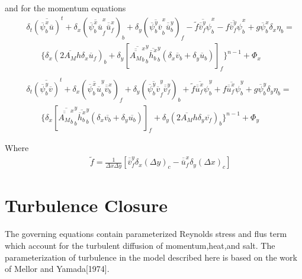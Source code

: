 \documentclass[oribibl]{llncs}
\begin{document}
and for the momentum equations
\begin{eqnarray}
&&\delta_t \overline{(\overline{\psi}^x_b \overline{u})}^t + \delta_x (\overline{\overline{\psi}^x_b \overline{u}}^x_f \overline{\overline{u}}^x_f)_b +  \delta_y (\overline{\overline{\psi}^y_b \overline{v}}^x_b \overline{\overline{u}}^y_b)_f - \overline {\tilde{f}\overline {\overline {v}}^y_f \psi}^x_b - \overline{f \overline{\overline{v}}^y_f \psi}^x_b + g\overline{\psi}^x_b \delta_x \eta_b = \nonumber \\
&&\ \ \ \ \ \ \ \  \{\delta_x (2 \overline {A_M}h\delta_x \overline{u}_f)_b+\delta_y [ \overline{ \overline {\overline{A_M}}^x_b }^y_b \overline {\overline{h}^x_b }^y_b (\delta_x \overline{v}_b + \delta_y \overline{u}_b)]_f\}^{n-1} + \Phi_x  \\
\nonumber \\
&&\delta_t \overline{(\overline{\psi}^y_b \overline{v})}^t + \delta_x (\overline{\overline{\psi}^x_b \overline{u}}^y_b \overline{\overline{v}}^x_b)_f +  \delta_y (\overline{\overline{\psi}^y_b \overline{v}}^y_f \overline{\overline{v}}^y_f)_b + \overline{ \tilde {f}\overline{\overline{u}}^x_f \psi}^y_b + \overline{f \overline{\overline{u}}^x_f \psi}^y_b + g\overline{\psi}^y_b \delta_y \eta_b = \nonumber \\
&&\ \ \ \ \ \ \ \  \{\delta_x [ \overline{ \overline {\overline {A_M}}^x_b }^y_b \overline {\overline{h}^x_b }^y_b (\delta_x \overline{v_b} + \delta_y \overline {u_b})]_f + \delta_y (2 \overline{A_M}h\delta_y \overline{v_f})_b \}^{n-1} + \Phi_y
 \end{eqnarray}

Where
\begin{eqnarray}
&&\tilde {f} = \frac{1}{\Delta x \Delta y} [ \overline {\overline {v}}^y_f \delta_x(\Delta y)_c - \overline {\overline {u}}^x_f \delta_y(\Delta x)_c ]
\end{eqnarray}



\section{Turbulence Closure}

The governing equations contain parameterized Reynolds stress and flus term which account for the turbulent diffusion of momentum,heat,and salt. The parameterization of turbulence in the model described here is based on the work of Mellor and Yamada[1974].
\end{document}
